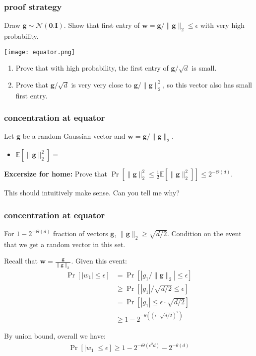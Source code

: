 \documentclass[compress]{beamer}
\newcommand{\bv}[1]{\mathbf{#1}}
\newcommand{\E}{\mathbb{E}}
\begin{document}
\begin{frame}
	\frametitle{proof strategy} 
Draw $\bv{g}\sim \mathcal{N}(\bv{0}.\bv{I})$. Show that first entry of $\bv{w} = \bv{g}/\|\bv{g}\|_2 \leq \epsilon$ with very high probability.\vspace{-1em}
	\begin{center}
	\texttt{[image: equator.png]}
	\end{center}

	\begin{enumerate}
		\item Prove that with high probability, the first entry of $\bv{g}/\sqrt{d}$ is small. 
		\item Prove that $\bv{g}/\sqrt{d}$ is very very close to $\bv{g}/\|\bv{g}\|_2^2$, so this vector also has small first entry.
	\end{enumerate}
\end{frame}

\begin{frame}[t]
	\frametitle{concentration at equator}
	Let $\bv{g}$ be a random Gaussian vector and $\bv{w} = \bv{g}/\|\bv{g}\|_2$. 
	\begin{itemize}
		\item $\E[\|\bv{g}\|_2^2] = $
		\vspace{3em}
	\end{itemize} 
\textbf{Excersize for home:} Prove that $\Pr\left[\|\bv{g}\|_2^2\leq \frac{1}{2}\E[\|\bv{g}\|_2^2]\right] \leq 2^{-\Theta(d)}$. 

This should intuitively make sense. Can  you tell me why?
\end{frame}

\begin{frame}[t]
	\frametitle{concentration at equator}
	For $1 - 2^{-\Theta(d)}$ fraction of vectors $\bv{g}$, $\|\bv{g}\|_2 \geq \sqrt{d/2}$. Condition on the event that we get a random vector in this set. 
	
	Recall that $\bv{w} = \frac{\bv{g}}{\|\bv{g}\|_2}$. Given this event:
	\begin{align*}
	\Pr\left[|{w}_1| \leq \epsilon\right] &= \Pr\left[|g_1/\|\bv{g}\|_2| \leq \epsilon\right]\\
	&\geq \Pr\left[|g_1|/\sqrt{d/2} \leq \epsilon \right]\\
	&= \Pr\left[|g_1| \leq \epsilon\cdot \sqrt{d/2} \right]\\
	&\geq 1 - 2^{-\theta\left((\epsilon\cdot \sqrt{d/2})^2\right)}
	\end{align*}

	By union bound, overall we have:
	\begin{align*}
		\Pr\left[|{w}_1| \leq \epsilon\right] \geq 1 - 2^{-\Theta\left(\epsilon^2d\right)} - 2^{-\theta(d)}
	\end{align*}

\end{frame}
\end{document}
